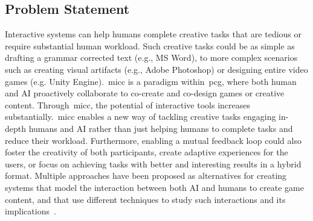 




\subsection{Problem Statement} \label{sec:problemst}

Interactive systems can help humans complete creative tasks that are tedious or require substantial human workload. Such creative tasks could be as simple as drafting a grammar corrected text (e.g., MS Word), to more complex scenarios such as creating visual artifacts (e.g., Adobe Photoshop) or designing entire video games (e.g. Unity Engine).~\acrlong{micc} is a paradigm within~\acrshort{pcg}, where both human and AI proactively collaborate to co-create and co-design games or creative content. Through~\acrshort{micc}, the potential of interactive tools increases substantially.~\acrshort{micc} enables a new way of tackling creative tasks engaging in-depth humans and AI rather than just helping humans to complete tasks and reduce their workload. Furthermore, enabling a mutual feedback loop could also foster the creativity of both participants, create adaptive experiences for the users, or focus on achieving tasks with better and interesting results in a hybrid format. Multiple approaches have been proposed as alternatives for creating systems that model the interaction between both AI and humans to create game content, and that use different techniques to study such interactions and its implications~\cite{Alvarez2020-ICMAPE,smith_tanagra:_2011,Liapis2013-sentientsketchbook,charity2020baba}. 

